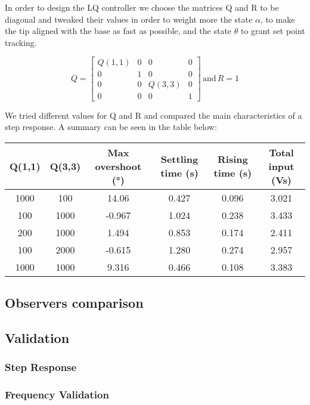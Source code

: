 
                In order to design the LQ controller we choose the matrices Q and R to be diagonal and tweaked their values in order to weight more the state $\alpha$, to make the tip aligned with the base as fast as possible, and the state $\theta$ to grant set point tracking.

                \begin{equation*}
                Q = 
                    \begin{bmatrix}
                    Q(1,1) & 0 & 0 & 0 \\
                    0 & 1 & 0 & 0 \\
                    0 & 0 & Q(3,3) & 0 \\
                    0 & 0 & 0 & 1 
                \end{bmatrix} \,
                \text{and} \, R = 1
                \end{equation*} 

                We tried different values for Q and R and compared the main characteristics of a step response.
                A summary can be seen in the table below:

                \begin{table}[h!]
                    \centering
                    \hspace*{-3em}
                    \begin{tabular}{||c c c c c c||} 
                    \hline
                    Q(1,1)  & Q(3,3) & Max overshoot (°) & Settling time (s)& Rising time (s) & Total input (Vs)\\ 
                    \hline\hline
                    1000 & 100 & 14.06 & 0.427 & 0.096 & 3.021 \\ 
                    \hline
                    100 & 1000 & -0.967 & 1.024 & 0.238 & 3.433 \\
                    \hline
                    200 & 1000 & 1.494 & 0.853 & 0.174 & 2.411 \\
                    \hline
                    100 & 2000 & -0.615 & 1.280 & 0.274 & 2.957 \\
                    \hline
                    1000 & 1000 & 9.316 & 0.466 & 0.108 & 3.383 \\ [1ex] 
                    \hline
                    \end{tabular}
                \end{table}


            \subsection{Observers comparison}

            \subsection{Validation}

                \subsubsection{Step Response}
                \subsubsection{Frequency Validation}